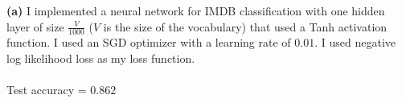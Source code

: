 \documentclass[submit]{harvardml}
\begin{document}
\newpage


\textbf{(a)} I implemented a neural network for IMDB classification with one hidden layer of size $\frac{V}{1000}$ ($V$ is the size of the vocabulary) that used a Tanh activation function. I used an SGD optimizer with a learning rate of $0.01$. I used negative log likelihood loss as my loss function.\\\\
Test accuracy = $0.862$
\end{document}
